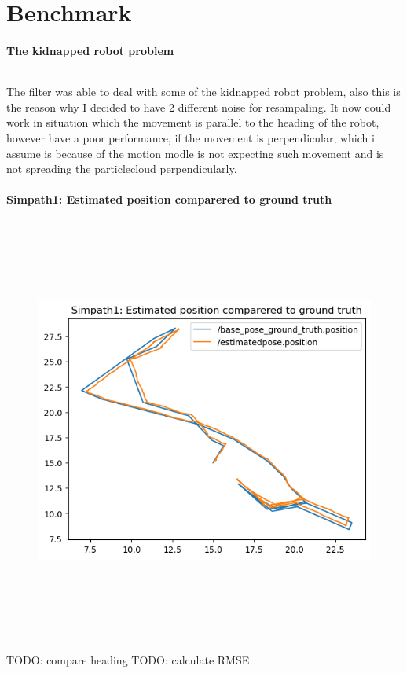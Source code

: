 \documentclass[11pt,a4paper]{article}
\begin{document}
  \part{Benchmark}
  \subsection{The kidnapped robot problem}
    \paragraph{}
    The filter was able to deal with some of the kidnapped robot problem, also this is the reason
    why I decided to have 2 different noise for resampaling. It now could work in situation which the movement
    is parallel to the heading of the robot, however have a poor performance, if the movement is perpendicular,
    which i assume is because of the motion modle is not expecting such movement and is not spreading
    the particlecloud perpendicularly.
  \subsection{Simpath1: Estimated position comparered to ground truth}
  \begin{figure}[h]
  \centering
  \includegraphics[width=14cm, height=14cm]{sim1_paths.png}
  \end{figure}
  TODO: compare heading
  TODO: calculate RMSE
\end{document}
